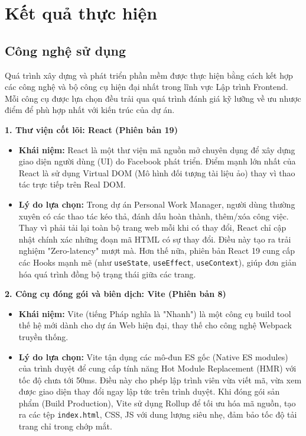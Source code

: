 \section{Kết quả thực hiện}

\subsection{Công nghệ sử dụng}
Quá trình xây dựng và phát triển phần mềm được thực hiện bằng cách kết hợp các công nghệ và bộ công cụ hiện đại nhất trong lĩnh vực Lập trình Frontend. Mỗi công cụ được lựa chọn đều trải qua quá trình đánh giá kỹ lưỡng về ưu nhược điểm để phù hợp nhất với kiến trúc của dự án.

\textbf{1. Thư viện cốt lõi: React (Phiên bản 19)}
\begin{itemize}
    \item \textbf{Khái niệm:} React là một thư viện mã nguồn mở chuyên dụng để xây dựng giao diện người dùng (UI) do Facebook phát triển. Điểm mạnh lớn nhất của React là sử dụng Virtual DOM (Mô hình đối tượng tài liệu ảo) thay vì thao tác trực tiếp trên Real DOM.
    \item \textbf{Lý do lựa chọn:} Trong dự án Personal Work Manager, người dùng thường xuyên có các thao tác kéo thả, đánh dấu hoàn thành, thêm/xóa công việc. Thay vì phải tải lại toàn bộ trang web mỗi khi có thay đổi, React chỉ cập nhật chính xác những đoạn mã HTML có sự thay đổi. Điều này tạo ra trải nghiệm "Zero-latency" mượt mà. Hơn thế nữa, phiên bản React 19 cung cấp các Hooks mạnh mẽ (như \texttt{useState}, \texttt{useEffect}, \texttt{useContext}), giúp đơn giản hóa quá trình đồng bộ trạng thái giữa các trang.
\end{itemize}

\textbf{2. Công cụ đóng gói và biên dịch: Vite (Phiên bản 8)}
\begin{itemize}
    \item \textbf{Khái niệm:} Vite (tiếng Pháp nghĩa là "Nhanh") là một công cụ build tool thế hệ mới dành cho dự án Web hiện đại, thay thế cho công nghệ Webpack truyền thống.
    \item \textbf{Lý do lựa chọn:} Vite tận dụng các mô-đun ES gốc (Native ES modules) của trình duyệt để cung cấp tính năng Hot Module Replacement (HMR) với tốc độ chưa tới 50ms. Điều này cho phép lập trình viên vừa viết mã, vừa xem được giao diện thay đổi ngay lập tức trên trình duyệt. Khi đóng gói sản phẩm (Build Production), Vite sử dụng Rollup để tối ưu hóa mã nguồn, tạo ra các tệp \texttt{index.html}, CSS, JS với dung lượng siêu nhẹ, đảm bảo tốc độ tải trang chỉ trong chớp mắt.
\end{itemize}

